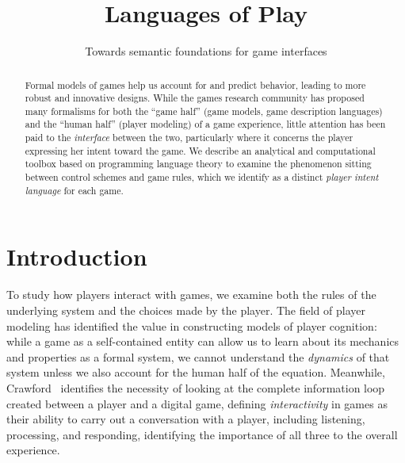\documentclass[sigconf]{acmart}
\begin{document}
\title{Languages of Play}
\subtitle{Towards semantic foundations for game interfaces}


% 


\begin{abstract}
Formal models of games help us account for and predict behavior, leading to
more robust and innovative designs. While the games research community has 
proposed many formalisms for both the ``game half'' (game models, game
description languages) and the ``human half'' (player modeling) of a game
experience, little attention has been paid to the {\em interface} between
the two, particularly where it concerns the player expressing her intent
toward the game. We describe an analytical and computational toolbox based
on programming language theory to examine the phenomenon sitting between
control schemes and game rules, which we identify as a distinct {\em
player intent language} for each game.
\end{abstract}



\maketitle

\section{Introduction}

To study how players interact with games, we examine both the rules of the
underlying system and the choices made by the player. 
The field of player modeling has identified the
value in constructing models of player cognition: while a game as
a self-contained entity can allow us to learn about its mechanics and
properties as a formal system, we cannot understand the {\em dynamics} of
that system unless we also account for the human half of the equation.
Meanwhile, Crawford~\cite{crawford2003chris} identifies the necessity of
looking at the complete information loop created between a player and a
digital game, defining {\em interactivity} in games as their ability to
carry out a conversation with a player, including listening, processing,
and responding, identifying the importance of all three to the overall
experience.
\end{document}
